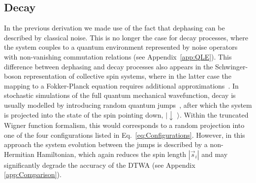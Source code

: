 \documentclass[pra,twocolumn,showpacs,preprintnumbers,amsmath,amssymb,superscriptaddress]{revtex4-1}
\begin{document}
\subsection{Decay}
In the previous derivation we made use of the fact that dephasing can be described by classical noise. This is no longer the case for decay processes, where the system couples to a quantum environment represented by noise operators with non-vanishing commutation relations (see Appendix~\ref{app:QLE}). 
This difference between dephasing and decay processes also appears in the Schwinger-boson representation of collective spin systems, where in the latter case the mapping to a Fokker-Planck equation requires additional
approximations~\cite{Huber2021}.
In stochastic simulations of the full quantum mechanical wavefunction, decay is usually modelled by introducing random quantum jumps~\cite{GardinerZoller}, after which  the system is projected into the state of the spin pointing down, $|\downarrow\,\,\rangle$. Within the truncated Wigner function formalism, this would corresponds to a random projection into one of the four configurations listed in Eq.~\eqref{eq:Configurations}. However, in this approach the system evolution between the jumps is described by a non-Hermitian Hamiltonian, which again reduces the spin length $|\vec s_i|$ and may significantly degrade the accuracy of the DTWA (see Appendix \ref{app:Comparison}).
\end{document}
